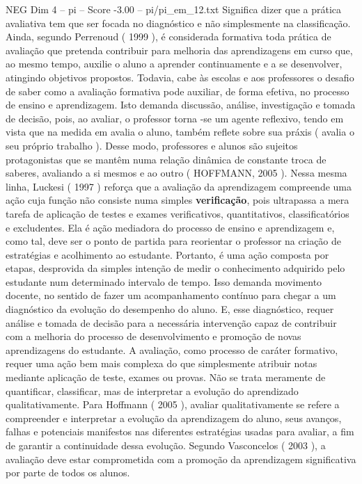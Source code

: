 \begin{textsample}{NEG Dim 4 – pi – Score -3.00 – pi/pi\_em\_12.txt}
Significa dizer que a prática avaliativa tem que ser focada no diagnóstico e não simplesmente na classificação.
Ainda, segundo Perrenoud ( 1999 ), é considerada formativa toda prática de avaliação que pretenda contribuir para melhoria das aprendizagens em curso que, ao mesmo tempo, auxilie o aluno a aprender continuamente e a se desenvolver, atingindo objetivos propostos.
Todavia, cabe às escolas e aos professores o desafio de saber como a avaliação formativa pode auxiliar, de forma efetiva, no processo de ensino e aprendizagem.
Isto demanda discussão, análise, investigação e tomada de decisão, pois, ao avaliar, o professor torna -se um agente reflexivo, tendo em vista que na medida em avalia o aluno, também reflete sobre sua práxis ( avalia o seu próprio trabalho ).
Desse modo, professores e alunos são sujeitos protagonistas que se mantêm numa relação dinâmica de constante troca de saberes, avaliando a si mesmos e ao outro ( HOFFMANN, 2005 ).
Nessa mesma linha, Luckesi ( 1997 ) reforça que a avaliação da aprendizagem compreende uma ação cuja função não consiste numa simples \textbf{verificação}, pois ultrapassa a mera tarefa de aplicação de testes e exames verificativos, quantitativos, classificatórios e excludentes.
Ela é ação mediadora do processo de ensino e aprendizagem e, como tal, deve ser o ponto de partida para reorientar o professor na criação de estratégias e acolhimento ao estudante.
Portanto, é uma ação composta por etapas, desprovida da simples intenção de medir o conhecimento adquirido pelo estudante num determinado intervalo de tempo.
Isso demanda movimento docente, no sentido de fazer um acompanhamento contínuo para chegar a um diagnóstico da evolução do desempenho do aluno.
E, esse diagnóstico, requer análise e tomada de decisão para a necessária intervenção capaz de contribuir com a melhoria do processo de desenvolvimento e promoção de novas aprendizagens do estudante.
A avaliação, como processo de caráter formativo, requer uma ação bem mais complexa do que simplesmente atribuir notas mediante aplicação de teste, exames ou provas.
Não se trata meramente de quantificar, classificar, mas de interpretar a evolução do aprendizado qualitativamente.
Para Hoffmann ( 2005 ), avaliar qualitativamente se refere a compreender e interpretar a evolução da aprendizagem do aluno, seus avanços, falhas e potenciais manifestos nas diferentes estratégias usadas para avaliar, a fim de garantir a continuidade dessa evolução.
Segundo Vasconcelos ( 2003 ), a avaliação deve estar comprometida com a promoção da aprendizagem significativa por parte de todos os alunos.

\end{textsample}
